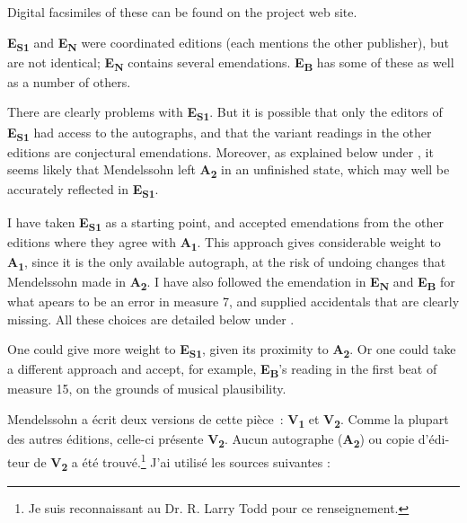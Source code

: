 \documentclass[a4paper, 12pt]{book}
\newcommand{\source}[2]{\textbf{#1\textsubscript{#2}}}
\newcommand{\bigdot}[0]{{\Large \textbullet}}
\newcommand{\centerbigdot}[0]{\begin{center}\bigdot\end{center}}
\begin{document}
{    Digital facsimiles of these can be found on the project web
    site.

    \source{E}{S1} and \source{E}{N} were coordinated editions (each
    mentions the other publisher), but are not identical;
    \source{E}{N} contains several emendations. \source{E}{B} has some
    of these as well as a number of others.

    There are clearly problems with \source{E}{S1}. But it is possible
    that only the editors of \source{E}{S1} had access to the
    autographs, and that the variant readings in the other editions
    are conjectural emendations. Moreover, as explained below under
    , it seems likely that Mendelssohn left
    \source{A}{2} in an unfinished state, which may well be accurately
    reflected in \source{E}{S1}.

    I have taken \source{E}{S1} as a starting point, and accepted
    emendations from the other editions where they agree with
    \source{A}{1}. This approach gives considerable weight to
    \source{A}{1}, since it is the only available autograph, at the
    risk of undoing changes that Mendelssohn made in \source{A}{2}.  I
    have also followed the emendation in \source{E}{N} and
    \source{E}{B} for what apears to be an error in measure 7, and
    supplied accidentals that are clearly missing. All these choices
    are detailed below under .

    One could give more weight to \source{E}{S1}, given its proximity
    to \source{A}{2}. Or one could take a different approach and
    accept, for example, \source{E}{B}'s reading in the first beat of
    measure 15, on the grounds of musical plausibility.

    \centerbigdot

    \begin{otherlanguage}{french}
    Mendelssohn a écrit deux versions de cette pièce~: \source{V}{1} et
    \source{V}{2}. Comme la plupart des autres éditions, celle-ci présente
    \source{V}{2}. Aucun autographe (\source{A}{2}) ou copie d'éditeur
    de \source{V}{2} a été trouvé.\footnote{Je suis reconnaissant au
      Dr. R. Larry Todd pour ce renseignement.} J'ai utilisé les sources
    suivantes :
    

\end{otherlanguage}}
\end{document}

